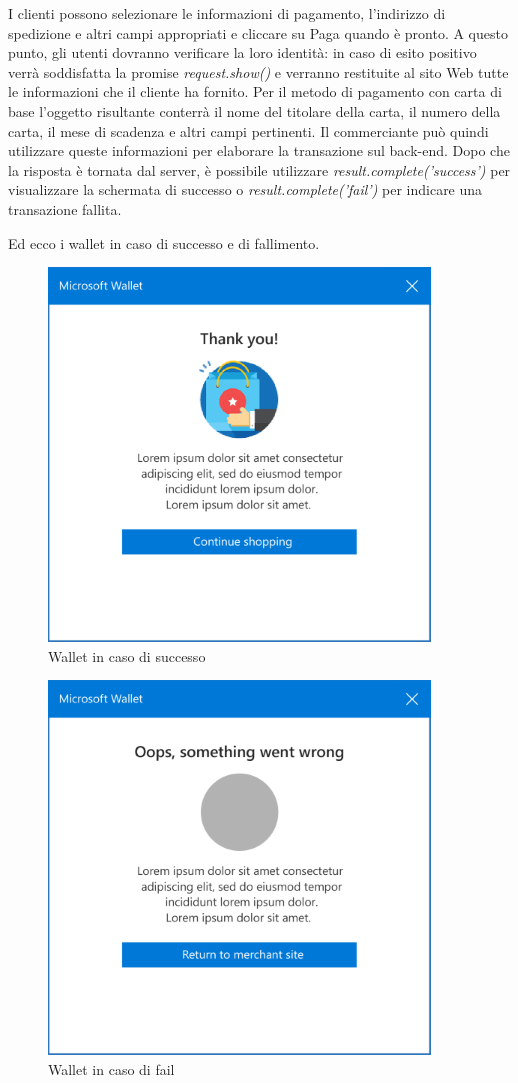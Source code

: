\documentclass[11pt ,a4paper , twoside , openright ]{book}
\begin{document}
	I clienti possono  selezionare le informazioni di pagamento, l'indirizzo di spedizione e altri campi appropriati e cliccare su Paga quando è pronto. A questo punto, gli utenti dovranno verificare la loro identità: in caso di esito positivo verrà soddisfatta la promise \textit{request.show()} e verranno restituite al sito Web tutte le informazioni che il cliente ha fornito. Per il metodo di pagamento con carta di base l'oggetto risultante conterrà il nome del titolare della carta, il numero della carta, il mese di scadenza e altri campi pertinenti. Il commerciante può quindi utilizzare queste informazioni per elaborare la transazione sul back-end.
	Dopo che la risposta è tornata dal server, è possibile utilizzare \textit{result.complete('success')} per visualizzare la schermata di successo o \textit{result.complete('fail')} per indicare una transazione fallita.
	
	\pagebreak
	Ed ecco i wallet in caso di successo e di fallimento.
	\begin{figure}[h]
		\centering
		\includegraphics[width=0.5\linewidth]{wallet2}
		\caption{Wallet in caso di successo}
		\label{fig: Wallet in caso di successo}
	\end{figure}
	\begin{figure}[h]
		\centering
		\includegraphics[width=0.5\linewidth]{wallet3}
		\caption{Wallet in caso di fail}
		\label{fig: Wallet in caso di fail}
	\end{figure}
	\pagebreak
	
\end{document}
